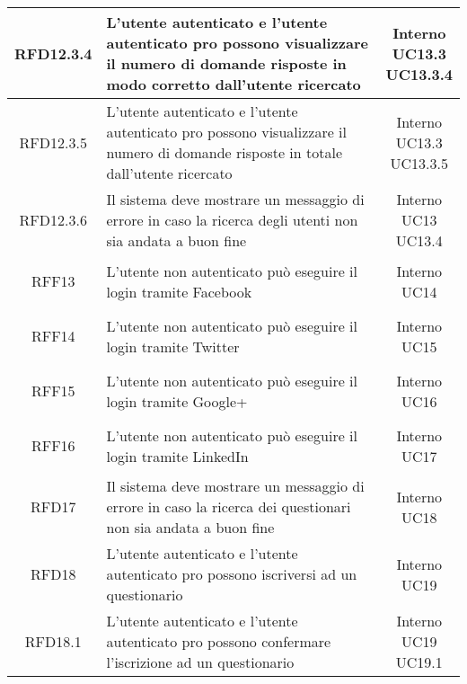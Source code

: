 \begin{longtable}{|c|>{\centering}m{7cm}|c|}
			 \hypertarget{{RFD12.3.4}}{{RFD12.3.4}} & L’utente autenticato e l’utente autenticato pro possono visualizzare il numero di domande risposte in modo corretto dall'utente ricercato & \makecell{Interno\\ UC13.3 \\UC13.3.4 } \\ \hline
			 \hypertarget{{RFD12.3.5}}{{RFD12.3.5}} & L’utente autenticato e l’utente autenticato pro possono visualizzare il numero di domande risposte in totale dall'utente ricercato & \makecell{Interno\\ UC13.3 \\UC13.3.5 } \\ \hline
			 \hypertarget{{RFD12.3.6}}{{RFD12.3.6}} & Il sistema deve mostrare un messaggio di errore in caso la ricerca degli utenti non sia andata a buon fine & \makecell{Interno\\ UC13 \\UC13.4 } \\ \hline
			 \hypertarget{{RFF13}}{{RFF13}} & L’utente non autenticato può eseguire il
login tramite Facebook & \makecell{Interno\\ UC14 } \\ \hline
			 \hypertarget{{RFF14}}{{RFF14}} & L’utente non autenticato può eseguire il
login tramite Twitter & \makecell{Interno\\ UC15 } \\ \hline
			 \hypertarget{{RFF15}}{{RFF15}} & L’utente non autenticato può eseguire il
login tramite Google+ & \makecell{Interno\\ UC16 } \\ \hline
			 \hypertarget{{RFF16}}{{RFF16}} & L’utente non autenticato può eseguire il
login tramite LinkedIn & \makecell{Interno\\ UC17 } \\ \hline
			 \hypertarget{{RFD17}}{{RFD17}} & Il sistema deve mostrare un messaggio di errore in caso la ricerca dei questionari non sia andata a buon fine & \makecell{Interno\\ UC18 } \\ \hline
			 \hypertarget{{RFD18}}{{RFD18}} & L’utente autenticato e l’utente
autenticato pro possono iscriversi ad un
questionario & \makecell{Interno\\ UC19 } \\ \hline
			 \hypertarget{{RFD18.1}}{{RFD18.1}} & L’utente autenticato e l’utente
autenticato pro possono confermare
l’iscrizione ad un questionario & \makecell{Interno\\ UC19 \\UC19.1 } \\ \hline

\end{longtable}
